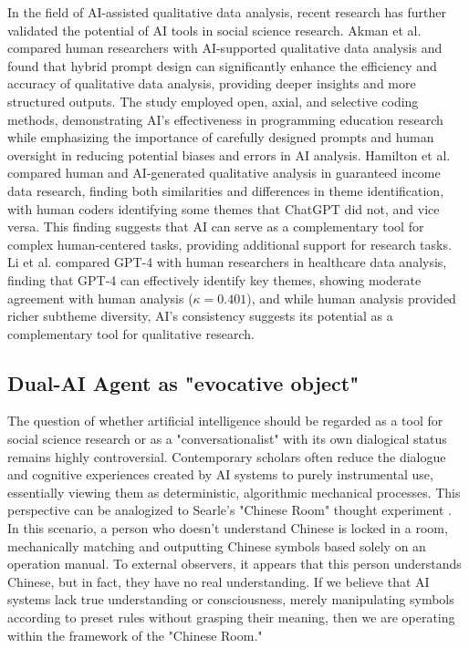 \documentclass[sigchi,nonacm,manuscript]{acmart}
\begin{document}
In the field of AI-assisted qualitative data analysis, recent research has further validated the potential of AI tools in social science research. Akman et al. \citep{akmanHumanResearcherVs2025} compared human researchers with AI-supported qualitative data analysis and found that hybrid prompt design can significantly enhance the efficiency and accuracy of qualitative data analysis, providing deeper insights and more structured outputs. The study employed open, axial, and selective coding methods, demonstrating AI's effectiveness in programming education research while emphasizing the importance of carefully designed prompts and human oversight in reducing potential biases and errors in AI analysis. Hamilton et al. \citep{hamiltonExploringUseAI2023} compared human and AI-generated qualitative analysis in guaranteed income data research, finding both similarities and differences in theme identification, with human coders identifying some themes that ChatGPT did not, and vice versa. This finding suggests that AI can serve as a complementary tool for complex human-centered tasks, providing additional support for research tasks. Li et al. \citep{liComparingGPT4Human2024} compared GPT-4 with human researchers in healthcare data analysis, finding that GPT-4 can effectively identify key themes, showing moderate agreement with human analysis ($\kappa=0.401$), and while human analysis provided richer subtheme diversity, AI's consistency suggests its potential as a complementary tool for qualitative research.

\subsection{Dual-AI Agent as "evocative object"}
The question of whether artificial intelligence should be regarded as a tool for social science research or as a "conversationalist" with its own dialogical status remains highly controversial. Contemporary scholars often reduce the dialogue and cognitive experiences created by AI systems to purely instrumental use, essentially viewing them as deterministic, algorithmic mechanical processes. This perspective can be analogized to Searle's "Chinese Room" thought experiment \citep{searleMindsBrainsPrograms1980}. In this scenario, a person who doesn't understand Chinese is locked in a room, mechanically matching and outputting Chinese symbols based solely on an operation manual. To external observers, it appears that this person understands Chinese, but in fact, they have no real understanding. If we believe that AI systems lack true understanding or consciousness, merely manipulating symbols according to preset rules without grasping their meaning, then we are operating within the framework of the "Chinese Room."
\end{document}
